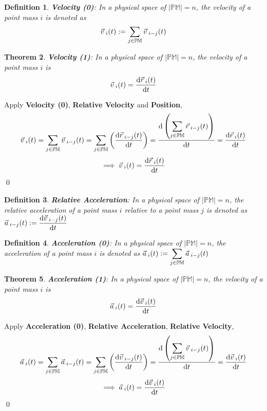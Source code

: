 \documentclass[12pt]{amsart}
\newtheorem{theorem}{Theorem}[section]
\newtheorem{definition}[theorem]{Definition}
\renewenvironment{proof}{{\bfseries Proof.}}{\qed}
\let\oldvec\vec
\renewcommand{\vec}[1]{\oldvec{#1}\hspace{0.1em}}
\begin{document}
\begin{definition}
\textbf{Velocity (0)}: In a physical space of $\left | \mathbb{PM} \right | = n$, the velocity of a point mass $i$ is denoted as
$$\vec{v}_i(t) := \displaystyle \sum_{j \in \mathbb{PM}} \vec{v}_{i-j} (t)$$
\end{definition}

\begin{theorem}
\textbf{Velocity (1)}: In a physical space of $\left | \mathbb{PM} \right | = n$, the velocity of a point mass $i$ is
$$\vec{v}_i(t) = \dfrac{\mathrm{d} \vec{r}_{i} (t)}{\mathrm{d} t}$$
\end{theorem}

\begin{proof}
    Apply \textbf{Velocity (0)}, \textbf{Relative Velocity} and \textbf{Position},
    $$\vec{v}_i (t) = \sum_{j \in \mathbb{PM}} \vec{v}_{i-j} (t) = \sum_{j \in \mathbb{PM}} \left ( \dfrac{\mathrm{d} \vec{r}_{i-j}(t)}{\mathrm{d} t} \right )= \dfrac{\mathrm{d} \left ( \displaystyle \sum_{j \in \mathbb{PM}} \vec{r}_{i-j}(t) \right )}{\mathrm{d} t} = \dfrac{\mathrm{d} \vec{r}_{i}(t)}{\mathrm{d} t} $$
    $$\implies \vec{v}_i(t) = \dfrac{\mathrm{d} \vec{r}_{i} (t)}{\mathrm{d} t} $$
\end{proof}

\begin{definition}
\textbf{Relative Acceleration}: In a physical space of $\left | \mathbb{PM} \right | = n$, the relative acceleration of a point mass $i$ relative to a point mass $j$ is denoted as $\vec{a}_{i-j}(t) := \dfrac{\mathrm{d} \vec{v}_{i-j} (t)}{\mathrm{d} t} $
\end{definition}

\begin{definition}
\textbf{Acceleration (0)}: In a physical space of $\left | \mathbb{PM} \right | = n$, the acceleration of a point mass $i$ is denoted as $\vec{a}_i(t) := \displaystyle \sum_{j \in \mathbb{PM}} \vec{a}_{i-j} (t)$
\end{definition}

\begin{theorem}
\textbf{Acceleration (1)}: In a physical space of $\left | \mathbb{PM} \right | = n$, the velocity of a point mass $i$ is $$\vec{a}_i(t) = \dfrac{\mathrm{d} \vec{v}_{i} (t)}{\mathrm{d} t}$$
\end{theorem}

\begin{proof}
    Apply \textbf{Acceleration (0)}, \textbf{Relative Acceleration}, \textbf{Relative Velocity},
    $$\vec{a}_i (t) = \sum_{j \in \mathbb{PM}} \vec{a}_{i-j} (t) = \sum_{j \in \mathbb{PM}} \left ( \dfrac{\mathrm{d} \vec{v}_{i-j}(t)}{\mathrm{d} t} \right )= \dfrac{\mathrm{d} \left ( \displaystyle \sum_{j \in \mathbb{PM}} \vec{v}_{i-j}(t) \right )}{\mathrm{d} t} = \dfrac{\mathrm{d} \vec{v}_{i}(t)}{\mathrm{d} t} $$
    $$\implies \vec{a}_i(t) = \dfrac{\mathrm{d} \vec{v}_{i} (t)}{\mathrm{d} t} $$
\end{proof}
\end{document}
